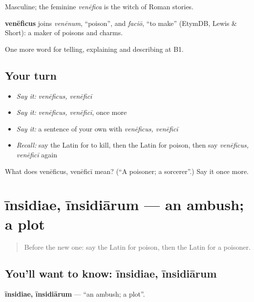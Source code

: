 Masculine; the feminine \emph{venēfica} is the witch of Roman stories.

\begin{cousinweb}
\textbf{venēficus} joins \emph{venēnum}, \textquotedblleft{}poison\textquotedblright{}, and \emph{faciō}, \textquotedblleft{}to make\textquotedblright{} (EtymDB, Lewis \& Short): a maker of poisons and charms.
\end{cousinweb}

\begin{grammarlens}[title={What you've built}]
One more word for telling, explaining and describing at B1.
\end{grammarlens}

\subsection*{Your turn}
\begin{itemize}
\raggedright
  \item \emph{Say it:} \emph{venēficus, venēficī}
  \item \emph{Say it:} \emph{venēficus, venēficī}, once more
  \item \emph{Say it:} a sentence of your own with \emph{venēficus, venēficī}
  \item \emph{Recall:} say the Latin for to kill, then the Latin for poison, then say \emph{venēficus, venēficī} again
\end{itemize}

\begin{tcolorbox}[breakable,colback=teal!4,colframe=teal!35!black,title={Before you move on}]
What does venēficus, venēficī mean? (\textquotedblleft{}A poisoner; a sorcerer\textquotedblright{}.) Say it once more.
\end{tcolorbox}
\section[īnsidiae, īnsidiārum]{īnsidiae, īnsidiārum — an ambush; a plot}

\label{lesson:LA-C307-insidiae}



\begin{quote}
Before the new one: say the Latin for poison, then the Latin for a poisoner.
\end{quote}

\subsection*{You'll want to know: īnsidiae, īnsidiārum}
\textbf{īnsidiae, īnsidiārum} — \textquotedblleft{}an ambush; a plot\textquotedblright{}.

